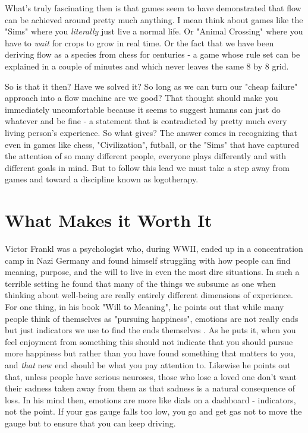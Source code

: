 \documentclass[11pt,a5paper]{book}
\begin{document}
What's truly fascinating then is that games seem to have demonstrated that flow can be achieved around pretty much anything. I mean think about games like the "Sims" where you \textit{literally} just live a normal life. Or "Animal Crossing" where you have to \textit{wait} for crops to grow in real time. Or the fact that we have been deriving flow as a species from chess for centuries - a game whose rule set can be explained in a couple of minutes and which never leaves the same 8 by 8 grid.
\newline

So is that it then? Have we solved it? So long as we can turn our "cheap failure" approach into a flow machine are we good? That thought should make you immediately uncomfortable because it seems to suggest humans can just do whatever and be fine - a statement that is contradicted by pretty much every living person's experience. So what gives? The answer comes in recognizing that even in games like chess, "Civilization", futball, or the "Sims" that have captured the attention of so many different people, everyone plays differently and with different goals in mind. But to follow this lead we must take a step away from games and toward a discipline known as logotherapy.

\section{What Makes it Worth It}
Victor Frankl was a psychologist who, during WWII, ended up in a concentration camp in Nazi Germany and found himself struggling with how people can find meaning, purpose, and the will to live in even the most dire situations. In such a terrible setting he found that many of the things we subsume as one when thinking about well-being are really entirely different dimensions of experience. For one thing, in his book "Will to Meaning", he points out that while many people think of themselves as "pursuing happiness", emotions are not really ends but just indicators we use to find the ends themselves \cite{frankl}. As he puts it, when you feel enjoyment from something this should not indicate that you should pursue more happiness but rather than you have found something that matters to you, and \textit{that} new end should be what you pay attention to. Likewise he points out that, unless people have serious neuroses, those who lose a loved one don't want their sadness taken away from them as that sadness is a natural consequence of loss. In his mind then, emotions are more like dials on a dashboard - indicators, not the point. If your gas gauge falls too low, you go and get gas not to move the gauge but to ensure that you can keep driving. 
\newline
\end{document}
